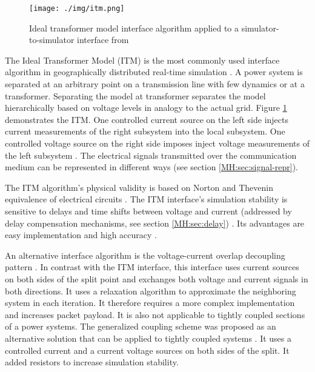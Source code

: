 \documentclass[a4paper]{atseminar}
\begin{document}
\begin{figure}[h]
 \centering
    \texttt{[image: ./img/itm.png]}
 \caption{Ideal transformer model interface algorithm applied to a simulator-to-simulator interface from \cite{stevic2015sim}}
 \label{MH:fig:itm}
\end{figure}

\label{MH:sec:itm}
The Ideal Transformer Model (ITM) is the most commonly used interface algorithm in geographically distributed real-time simulation \cite{montoya2020, syed2020standard}. A power system is separated at an arbitrary point on a transmission line with few dynamics or at a transformer. Separating the model at transformer separates the model hierarchically based on voltage levels in analogy to the actual grid. Figure \ref{MH:fig:itm} demonstrates the ITM. One controlled current source on the left side injects current measurements of the right subsystem into the local subsystem. One controlled voltage source on the right side imposes inject voltage measurements of the left subsystem \cite{stevic2017europe}. The electrical signals transmitted over the communication medium can be represented in different ways (see section \ref{MH:sec:signal-repr}).

The ITM algorithm's physical validity is based on Norton and Thevenin equivalence of electrical circuits \cite{ren2008}. The ITM interface's simulation stability is sensitive to delays and time shifts between voltage and current (addressed by delay compensation mechanisms, see section \ref{MH:sec:delay}) \cite{stevic2015sim}. Its advantages are easy implementation and high accuracy \cite{brandl2017}.

An alternative interface algorithm is the voltage-current overlap decoupling pattern \cite{wu2006}. In contrast with the ITM interface, this interface uses current sources on both sides of the split point and exchanges both voltage and current signals in both directions. It uses a relaxation algorithm to approximate the neighboring system in each iteration. It therefore requires a more complex implementation and increases packet payload. It is also not applicable to tightly coupled sections of a power systems. 
The generalized coupling scheme was proposed as an alternative solution that can be applied to tightly coupled systems \cite{bastos2007}. It uses a controlled current and a current voltage sources on both sides of the split. It added resistors to increase simulation stability.
\end{document}
